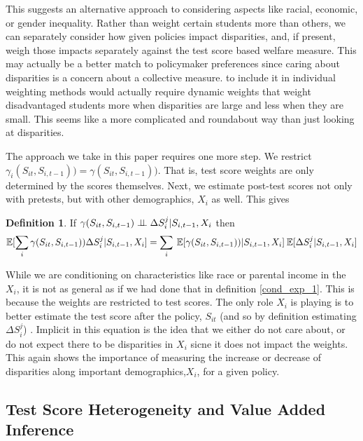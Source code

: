 \documentclass{article}
\theoremstyle{definition}
\theoremstyle{definition}
\theoremstyle{definition}
\theoremstyle{definition}
\newtheorem{definition}{Definition}
\begin{document}
    This suggests an alternative approach to considering aspects like racial, economic, or gender inequality. Rather than weight certain students more than others, we can separately consider how given policies impact disparities, and, if present, weigh those impacts separately against the test score based welfare measure. This may actually be a better match to policymaker preferences since caring about disparities is a concern about a collective measure. to include it in individual weighting methods would actually require dynamic weights that weight disadvantaged students more when disparities are large and less when they are small. This seems like a more complicated and roundabout way than just looking at disparities.
    
    The approach we take in this paper requires one more step. We restrict $\gamma_i(S_{it}, S_{i,t-1})) = \gamma(S_{it}, S_{i,t-1}))$. That is, test score weights are only determined by the scores themselves. Next, we estimate post-test scores not only with pretests, but with other demographics, $X_i$ as well. This gives 
    
    \begin{definition}
    \label{indep_def_used}
        If $ \gamma(S_{it}, S_{i,t-1}) \perp \!\!\! \perp \Delta S_i^j |S_{i,t-1}, X_i $ then
        \begin{equation*}
           \mathbb{E}[\sum_i \gamma(S_{it}, S_{i,t-1})) \Delta S_i^j| S_{i,t-1}, X_i]= \sum_i \: \mathbb{E}[\gamma(S_{it}, S_{i,t-1}))|S_{i,t-1}, X_i] \:\mathbb{E}[\Delta S_i^j|S_{i,t-1}, X_i] 
        \end{equation*}
    \end{definition}
    
    While we are conditioning on characteristics like race or parental income in the $X_i$, it is not as general as if we had done that in definition \ref{cond_exp_1}. This is because the weights are restricted to test scores. The only role $X_i$ is playing is to better estimate the test score after the policy, $S_{it}$ (and so by definition estimating $\Delta S_i^j$) . Implicit in this equation is the idea that we either do not care about, or do not expect there to be disparities in $X_i$ sicne it does not impact the weights. This again shows the importance of measuring the increase or decrease of disparities along important demographics,$X_i$, for a given policy. 
    
   \subsection{Test Score Heterogeneity and Value Added Inference}
   \label{va_hetero}
   
\end{document}

